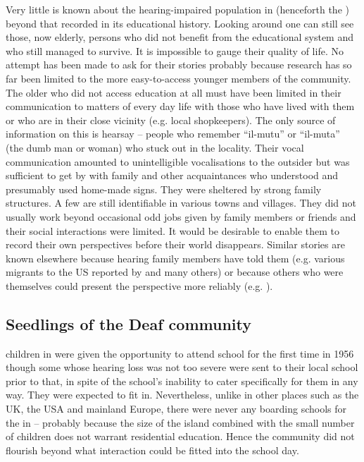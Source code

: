 \documentclass[output=paper]{langsci/langscibook}
\begin{document}
Very little is known about the hearing-impaired population in 
(henceforth the ) beyond that recorded in its educational history.
Looking around one can still see those, now elderly,  persons who
did not benefit from the educational system and who still managed to
survive.  It is impossible to gauge their quality of life.  No attempt
has been made to ask for their stories probably because research has
so far been limited to the more easy-to-access younger members of the
 community.  The older  who did not access education at all
must have been limited in their communication to matters of every day
life with those who have lived with them or who are in their close
vicinity (e.g. local shopkeepers).  The only source of information on
this is hearsay – people who remember “il-mutu” or “il-muta” (the dumb
man or woman) who stuck out in the locality.  Their vocal
communication amounted to unintelligible vocalisations to the outsider
but was sufficient to get by with family and other acquaintances who
understood and presumably used home-made signs.  They were sheltered
by strong family structures.  A few are still identifiable in various
towns and villages.  They did not usually work beyond occasional odd
jobs given by family members or friends and their social interactions
were limited.  It would be desirable to enable them to record their
own perspectives before their world disappears.  Similar stories are
known elsewhere because hearing family members have told them
(e.g. various migrants to the US reported by \citealt{t09} and
many others) or because others who were themselves  could present
the  perspective more reliably (e.g. \citealt{c96}).

\subsection{Seedlings of the Deaf community}\label{sec:azzopardi:2.2}
\largerpage
  
 children in  were given the opportunity to attend school for
the first time in 1956 though some whose hearing loss was not too
severe were sent to their local school prior to that, in spite of the
school’s inability to cater specifically for them in any way.  They
were expected to fit in.  Nevertheless, unlike in other places such as
the UK, the USA and mainland Europe, there were never any boarding
schools for the  in  – probably because the size of the
island combined with the small number of  children does not
warrant residential education.  Hence the  community did not
flourish beyond what interaction could be fitted into the school day.
\end{document}
